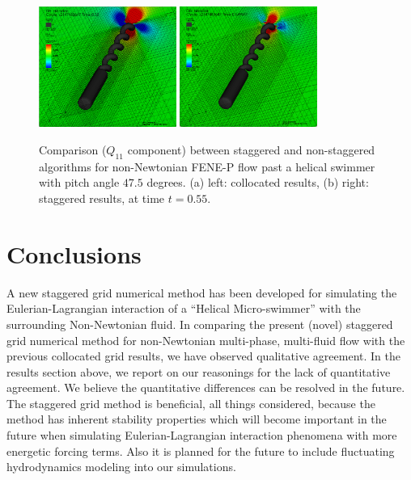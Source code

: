 \documentclass[]{article}
\begin{document}
\begin{figure}[htpb]
\centering
\includegraphics[width=0.4\textwidth]{collocated_47p5.png}
\includegraphics[width=0.4\textwidth]{staggared_47p5.png}
\caption{Comparison ($Q_{11}$ component) between staggered and 
    	non-staggered algorithms for 
        non-Newtonian FENE-P flow past a helical swimmer with pitch angle
        $47.5$ degrees.
	(a) left: collocated results, (b) right: staggered results,
	at time $t=0.55$. \label{helix47p5} }
\end{figure}

\section{Conclusions} 

A new staggered grid numerical method has been developed for simulating
the Eulerian-Lagrangian interaction of a ``Helical Micro-swimmer'' with
the surrounding Non-Newtonian fluid.
In comparing the present (novel) staggered grid numerical method for
non-Newtonian multi-phase, multi-fluid flow with the previous 
collocated grid results, we have observed qualitative agreement.  
In the results section above, we report on our reasonings for the
lack of quantitative agreement.  We believe the quantitative 
differences can be resolved in the future.
The staggered grid method is beneficial,
all things considered, because the method has inherent stability
properties\cite{GUITTET2015215} which will become important in 
the future when simulating
Eulerian-Lagrangian interaction phenomena with more energetic
forcing terms.  Also it is planned for the future to include
fluctuating hydrodynamics 
modeling\cite{PLUNKETT2014121,wang2018fluctuating} 
into our simulations.

\newpage


\end{document}
